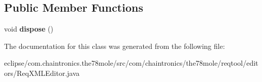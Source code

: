 \subsection*{Public Member Functions}
\begin{DoxyCompactItemize}
\item 
void {\bfseries dispose} ()\hypertarget{classcom_1_1chaintronics_1_1the78mole_1_1reqtool_1_1editors_1_1ReqXMLEditor_a9f2b2cb31534ba6febeb5139e9e1a3b2}{}\label{classcom_1_1chaintronics_1_1the78mole_1_1reqtool_1_1editors_1_1ReqXMLEditor_a9f2b2cb31534ba6febeb5139e9e1a3b2}

\end{DoxyCompactItemize}


The documentation for this class was generated from the following file\+:\begin{DoxyCompactItemize}
\item 
eclipse/com.\+chaintronics.\+the78mole/src/com/chaintronics/the78mole/reqtool/editors/Req\+X\+M\+L\+Editor.\+java\end{DoxyCompactItemize}
